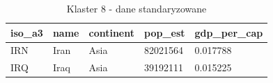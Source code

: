 \documentclass[11pt]{report}
\begin{document}
    \begin{table}[h!]
        \caption {Klaster 8 - dane standaryzowane} \label{tab:cl8std}
        \begin{tabular}{lllll}
            \hline
            \multicolumn{1}{|l|}{iso\_a3} & \multicolumn{1}{l|}{name} & \multicolumn{1}{l|}{continent} & \multicolumn{1}{l|}{pop\_est} & \multicolumn{1}{l|}{gdp\_per\_cap} \\ \hline
            IRN                           & Iran                      & Asia                           & 82021564                      & 0.017788                           \\
            IRQ                           & Iraq                      & Asia                           & 39192111                      & 0.015225
        \end{tabular}
    \end{table}
\end{document}
